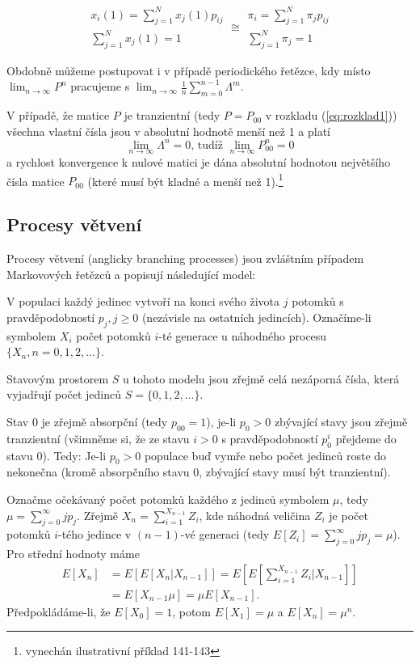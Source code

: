 \documentclass[10pt]{article}
\begin{document}
\begin{equation}
\begin{matrix}
x_i(1) = \sum_{j=1}^N x_j(1) p_{ij}\\
\sum_{j=1}^N x_j(1) =1
\end{matrix} 
\cong
\begin{matrix}
\pi_i = \sum_{j=1}^N \pi_j p_{ij}\\
\sum_{j=1}^N \pi_j =1
\end{matrix}
\end{equation}

Obdobně můžeme postupovat i v případě periodického řetězce, kdy místo $\lim_{n \to \infty} P^n$ pracujeme s $\lim_{n \to  \infty} \frac{1}{n} \sum_{m=0}^{n-1} \Lambda^m.$

V případě, že matice $P$ je tranzientní (tedy $P=P_{00}$ v rozkladu (\ref{eq:rozklad1})) všechna vlastní čísla jsou v absolutní hodnotě menší než 1 a platí $$\lim_{n \to \infty} \Lambda^n = 0\text{, tudíž } \lim_{n \to \infty} P_{00}^n = 0$$ a rychlost konvergence k nulové matici je dána absolutní hodnotou největšího čísla matice $P_{00}$ (které musí být kladné a menší než 1).\footnote{vynechán ilustrativní příklad 141-143}

\subsection{Procesy větvení}
Procesy větvení (anglicky branching processes) jsou zvláštním případem Markovových řetězců a popisují následující model:

V populaci každý jedinec vytvoří na konci svého života $j$ potomků s pravděpodobností $p_j,j \geq 0$ (nezávisle na ostatních jedincích). Označíme-li symbolem $X_i$ počet potomků $i$-té generace u náhodného procesu $\{X_n, n=0,1,2,...\}$.

Stavovým prostorem $S$ u tohoto modelu jsou zřejmě celá nezáporná čísla, která vyjadřují počet jedinců $S=\{0,1,2,...\}$.

Stav 0 je zřejmě absorpční (tedy $p_{00}=1$), je-li $p_0>0$ zbývající stavy jsou zřejmě tranzientní (všimněme si, že ze stavu $i>0$ s pravděpodobností $p_0^i$ přejdeme do stavu 0). Tedy: Je-li $p_0 >0$ populace buď vymře nebo počet jedinců roste do nekonečna (kromě absorpčního stavu 0, zbývající stavy musí být tranzientní).

Označme očekávaný počet potomků každého z jedinců symbolem $\mu$, tedy $\mu = \sum_{j=0}^{\infty} j p_j$. Zřejmě $X_n = \sum_{i=1}^{X_{n-1}} Z_i$, kde náhodná veličina $Z_i$ je počet potomků $i$-tého jedince v $(n-1)$-vé generaci (tedy $E[Z_i] = \sum_{j=0}^{\infty} j p_j = \mu$). Pro střední hodnoty máme
\begin{equation}
\begin{split}
E[X_n] 	&=E[E[X_n|X_{n-1}]] = E[E[\sum_{i=1}^{X_{n-1}} Z_i|X_{n-1}]]\\
		&=E[X_{n-1}\mu] = \mu E[X_{n-1}].
\end{split}
\end{equation}
Předpokládáme-li, že $E[X_0] = 1$, potom $E[X_1] = \mu$ a $E[X_n] = \mu^n$.
\end{document}

